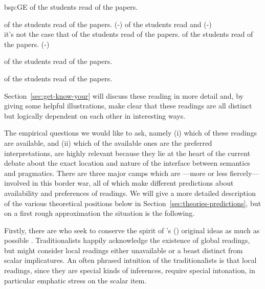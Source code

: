 \documentclass[fleqn,reqno,10pt,draft]{article}
\newcommand{\lit}{\acro{lit}}
\newcommand{\glb}{\acro{glb}}
\newcommand{\loc}{\acro{loc}}
\renewcommand{\es}{\acro{es}}
\newcommand{\mymark}[1]{{\color{mycol}{#1}}}
\begin{document}
\begin{exer}{bsp:GE}
\ex \mymark{Exactly one} of the students read {\mymark{some}} of the
  papers.

  \begin{xlist}
  \ex \label{bsp:GE-Literal} \mymark{Exactly one} of the students read
    {\mymark{some and maybe all}} of the papers. \hfill (\es-\lit)
  \ex \label{bsp:GE-Global}
    \mymark{Exactly one} of the students read \mymark{some} 
    and  \hfill (\es-\glb)\\
    it's not the case that \mymark{exactly one} of the students read \mymark{all} of the papers.
  \ex \label{bsp:GE-Local}
    \mymark{Exactly one} of the students read {\mymark{some  but not all}} of the
    papers. \hfill (\es-\loc)
  \end{xlist}
\end{exer}


\begin{exe}
\ex \label{bsp:AE-Alternative} \mymark{All} of the students read
  {\mymark{all}} of the papers. 

\ex \label{bsp:GE-Alternative} \mymark{Exactly one} of the students
  read {\mymark{all}} of the papers.
\end{exe}

\noindent Section~\ref{sec:get-know-your} will discuss these reading
in more detail and, by giving some helpful illustrations, make clear
that these readings are all distinct but logically dependent
on each other in interesting ways.

The empirical questions we would like to ask, namely (i) which of
these readings are available, and (ii) which of the available ones are
the preferred interpretations, are highly relevant because they lie at
the heart of the current debate about the exact location and nature of
the interface between semantics and pragmatics. There are three major
camps which are ---more or less fiercely--- involved in this border
war, all of which make different predictions about availability and
preferences of readings. We will give a more detailed description of
the various theoretical positions below in
Section~\ref{sec:theories-predictions}, but on a first rough
approximation the situation is the following. 

Firstly, there are \mymark{pragmatic traditionalists} who seek to
conserve the spirit of \citeauthor{Grice1975:Logic-and-Conve}'s
(\citeyear{Grice1975:Logic-and-Conve}) original ideas as much as
possible
\citep[e.g.][]{Spector2006:Scalar-Implicat,Sauerland2004:Scalar-Implicat,Russell2006:Against-Grammat,vanRooijSchulz:ExhaustiveInterpretation,Geurts2010:Quantity-Implic,Franke2011:Quantity-Implic}. Traditionalists
happily acknowledge the existence of global readings, but might
consider local readings either unavailable or a beast distinct from
scalar implicatures. An often phrased intuition of the traditionalists
is that local readings, since they are special kinds of inferences,
require special intonation, in particular emphatic stress on the
scalar item. 
\end{document}
